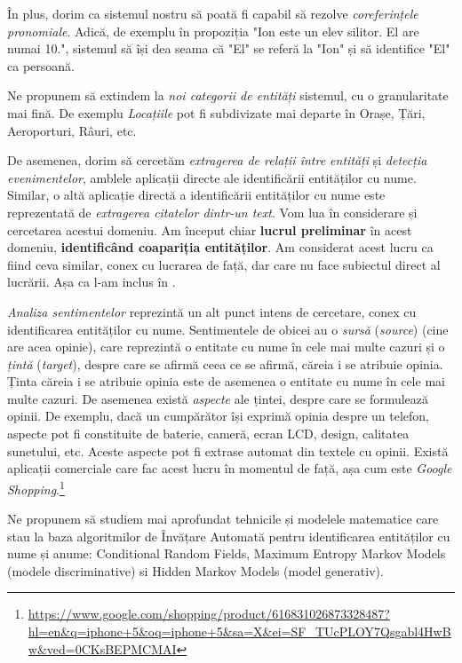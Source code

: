 În plus, dorim ca sistemul nostru să poată fi capabil să rezolve \textit{coreferințele pronomiale}. Adică, de exemplu în propoziția "Ion este un elev silitor. El are numai 10.", sistemul să își dea seama că "El" se referă la "Ion" și să identifice "El" ca persoană.

Ne propunem să extindem la \textit{noi categorii de entități} sistemul, cu o granularitate mai fină. De exemplu \textit{Locațiile} pot fi subdivizate mai departe în Orașe, Țări, Aeroporturi, Râuri, etc.

De asemenea, dorim să cercetăm \textit{extragerea de relații între entități} și \textit{detecția evenimentelor}, amblele aplicații directe ale identificării entităților cu nume. Similar, o altă aplicație directă a identificării entităților cu nume este reprezentată de \textit{extragerea citatelor dintr-un text}. Vom lua în considerare și cercetarea acestui domeniu. Am început chiar \textbf{lucrul preliminar} în acest domeniu, \textbf{identificând coapariția entităților}. Am considerat acest lucru ca fiind ceva similar, conex cu lucrarea de față, dar care nu face subiectul direct al lucrării. Așa ca l-am inclus în .

\textit{Analiza sentimentelor} reprezintă un alt punct intens de cercetare, conex cu identificarea entităților cu nume. Sentimentele de obicei au o \textit{sursă} (\textit{source}) (cine are acea opinie), care reprezintă o entitate cu nume în cele mai multe cazuri și o \textit{țintă} (\textit{target}), despre care se afirmă ceea ce se afirmă, căreia i se atribuie opinia. Ținta căreia i se atribuie opinia este de asemenea o entitate cu nume în cele mai multe cazuri. De asemenea există \textit{aspecte} ale țintei, despre care se formulează opinii. De exemplu, dacă un cumpărător își exprimă opinia despre un telefon, aspecte pot fi constituite de baterie, cameră, ecran LCD, design, calitatea sunetului, etc. Aceste aspecte pot fi extrase automat din textele cu opinii. Există aplicații comerciale care fac acest lucru în momentul de față, așa cum este \textit{Google Shopping}.\footnote{\url{https://www.google.com/shopping/product/616831026873328487?hl=en\&q=iphone+5\&oq=iphone+5\&sa=X\&ei=SF_TUcPLOY7Qsgabl4HwBw\&ved=0CKsBEPMCMAI}}

Ne propunem să studiem mai aprofundat tehnicile și modelele matematice care stau la baza algoritmilor de Învățare Automată pentru identificarea entităților cu nume și anume: Conditional Random Fields, Maximum Entropy Markov Models (modele discriminative) si Hidden Markov Models (model generativ). 

